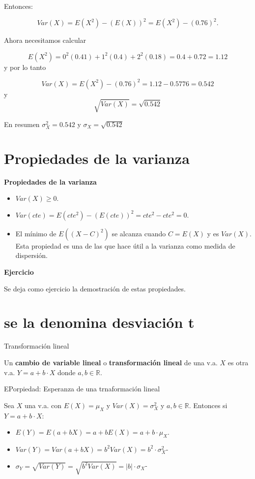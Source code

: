 \documentclass[
  letterpaper,
  DIV=11,
  numbers=noendperiod]{scrreprt}
\providecommand{\tightlist}{%
  \setlength{\itemsep}{0pt}\setlength{\parskip}{0pt}}\usepackage{longtable,booktabs,array}
\begin{document}
Entonces:

\[
Var(X)=E(X^2)-(E(X))^2 = E(X^2)-(0.76)^2.
\]

Ahora necesitamos calcular

\[E(X^2)= 0^2 (0.41)+ 1^2 (0.4)+ 2^2 (0.18)=0.4+0.72=1.12\] y por lo
tanto

\[Var(X)= E(X^2)-(0.76)^2=1.12-0.5776=0.542\] y
\[\sqrt{Var(X)}=\sqrt{0.542}\]

En resumen \(\sigma_{X}^2=0.542\) y \(\sigma_{X}=\sqrt{0.542}\)

\section{Propiedades de la varianza}\label{propiedades-de-la-varianza}

\textbf{Propiedades de la varianza}

\begin{itemize}
\tightlist
\item
  \(Var(X)\geq 0\).
\item
  \(Var(cte)=E(cte^2)-(E(cte))^2= cte^2 - cte^2=0\).
\item
  El mínimo de \(E((X-C)^2)\) se alcanza cuando \(C=E(X)\) y es
  \(Var(X)\). Esta propiedad es una de las que hace útil a la varianza
  como medida de dispersión.
\end{itemize}

\textbf{Ejercicio}

Se deja como ejercicio la demostración de estas propiedades.

\section{se la denomina desviación
t}\label{se-la-denomina-desviaciuxf3n-t}

Transformación lineal

Un \textbf{cambio de variable lineal} o \textbf{transformación lineal}
de una v.a. \(X\) es otra v.a. \(Y= a+ b\cdot  X\) donde
\(a,b\in\mathbb{R}\).

EPorpiedad: Esperanza de una trnaformación lineal

Sea \(X\) una v.a. con \(E(X)=\mu_{X}\) y \(Var(X)=\sigma_{X}^2\) y
\(a,b\in\mathbb{R}\). Entonces si \(Y=a+b\cdot  X\):

\begin{itemize}
\tightlist
\item
  \(E(Y)=E(a + b X)=a+ b E(X)= a + b \cdot \mu_{X}\).
\item
  \(Var(Y)=Var(a+bX)=b^2 Var(X)= b^2\cdot  \sigma_{X}^2\)-
\item
  \(\sigma_{Y}=\sqrt{Var(Y)}=\sqrt{b^2 Var(X)}=|b| \cdot \sigma_{X}\)-
\end{itemize}
\end{document}
